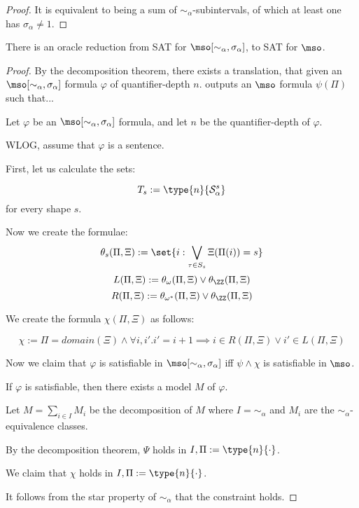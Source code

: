 \begin{proof}
  It is equivalent to being a sum of $\sim_{\alpha}$-subintervals,
  of which at least one has $\sigma_{\alpha} \ne 1$.
\end{proof}

\begin{theorem}
  There is an oracle reduction from SAT for $\mso[\sim_{\alpha}, \sigma_{\alpha}]$,
  to SAT for $\mso$.
\end{theorem}

\begin{proof}
  By the decomposition theorem, there exists a translation,
  that given an $\mso[\sim_{\alpha}, \sigma_{\alpha}]$ formula $\varphi$ of quantifier-depth $n$.
  outputs an $\mso$ formula $\psi(\Pi)$ such that...

  Let $\varphi$ be an $\mso[\sim_{\alpha}, \sigma_{\alpha}]$ formula,
  and let $n$ be the quantifier-depth of $\varphi$.

  WLOG, assume that $\varphi$ is a sentence.

  First, let us calculate the sets:

  \[T_s := \type{n}{\mathcal{S}^{s}_{\alpha}}\]
  for every shape $s$.

  Now we create the formulae:
  \[\theta_s(\Pi, \Xi) := \set{i : \bigvee_{\tau \in S_s}{\Xi(\Pi(i)) = s}}\]
  \[L(\Pi, \Xi) := \theta_{\omega}(\Pi, \Xi) \vee \theta_{\ZZ}(\Pi, \Xi)\]
  \[R(\Pi, \Xi) := \theta_{\omega^\ast}(\Pi, \Xi) \vee \theta_{\ZZ}(\Pi, \Xi)\]

  We create the formula $\chi(\Pi, \Xi)$ as follows:

  \[\chi := \Pi = domain(\Xi) \wedge \forall i, i'. i' = i + 1 \implies {i \in R(\Pi, \Xi) \vee i' \in L(\Pi, \Xi)}\]

  Now we claim that $\varphi$ is satisfiable in $\mso[\sim_{\alpha}, \sigma_{\alpha}]$
  iff $\psi \land \chi$ is satisfiable in $\mso$.

  If $\varphi$ is satisfiable, then there exists a model $M$ of $\varphi$.

  Let $M = \sum_{i \in I} M_i$ be the decomposition of $M$
  where $I = \sim_{\alpha}$ and $M_i$ are the $\sim_{\alpha}$-equivalence classes.

  By the decomposition theorem, $\Psi$ holds
  in $I, \Pi := \type{n}{\cdot}$.

  We claim that $\chi$ holds in $I, \Pi := \type{n}{\cdot}$.

  It follows from the star property of $\sim_{\alpha}$ that the constraint holds.


\end{proof}
